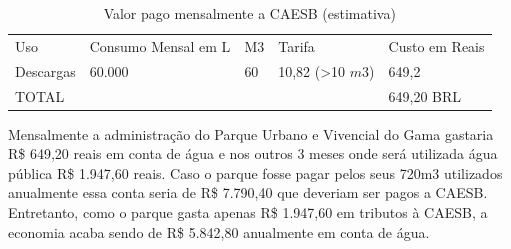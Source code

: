 \begin{table}[h]
\centering
\caption{Valor pago mensalmente a CAESB (estimativa)}
\label{Valor pago mensalmente a CAESB (estimativa)}
\begin{tabular}{lllll}
 &  &  &  &  \\ \hline
\multicolumn{1}{|l|}{Uso} & \multicolumn{1}{l|}{Consumo Mensal em L} & \multicolumn{1}{l|}{M3} & \multicolumn{1}{l|}{Tarifa} & \multicolumn{1}{l|}{Custo em Reais} \\ \hline
\multicolumn{1}{|l|}{Descargas} & \multicolumn{1}{l|}{60.000} & \multicolumn{1}{l|}{60} & \multicolumn{1}{l|}{10,82 (\textgreater10 $m{3}$)} & \multicolumn{1}{l|}{649,2} \\ \hline
\multicolumn{1}{|l|}{TOTAL} & \multicolumn{1}{l|}{} & \multicolumn{1}{l|}{} & \multicolumn{1}{l|}{} & \multicolumn{1}{l|}{649,20 BRL} \\ \hline
\end{tabular}
\end{table}

Mensalmente a administração do Parque Urbano e Vivencial do Gama gastaria R\$ 649,20 reais em conta de água e nos outros 3 meses onde será utilizada água pública R\$ 1.947,60 reais. Caso o parque fosse pagar pelos seus 720m3 utilizados anualmente essa conta seria de R\$ 7.790,40 que deveriam ser pagos a CAESB. Entretanto, como o parque gasta apenas R\$ 1.947,60 em tributos à CAESB, a economia acaba sendo de R\$ 5.842,80 anualmente em conta de água. 
